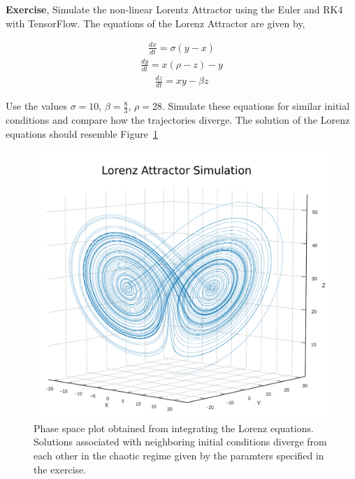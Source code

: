 \documentclass[10pt,letterpaper]{article}
\begin{document}
\textbf{Exercise}, Simulate the non-linear Lorentz Attractor using the Euler and RK4 with TensorFlow. The equations of the Lorenz Attractor are given by,

\begin{eqnarray}\frac{dx}{dt}=\sigma(y-x) \end{eqnarray}
\begin{eqnarray}\frac{dy}{dt}=x(\rho-z)-y \end{eqnarray}
\begin{eqnarray}\frac{dz}{dt}=xy-\beta z \end{eqnarray}

Use the values $\sigma =10$, $\beta =\frac{8}{3}$, $\rho =28$. Simulate these equations for similar initial conditions and compare how the trajectories diverge. The solution of the Lorenz equations should resemble Figure~\ref{fig:Lorenz}
 
\begin{figure}[H]
\begin{center}
\includegraphics[scale=0.5]{fig6_op.pdf} 
\caption{Phase space plot obtained from integrating the Lorenz equations. Solutions associated with neighboring initial conditions diverge from each other in the chaotic regime given by the paramters specified in the exercise.}
\label{fig:Lorenz}
\end{center}

\end{figure}
\end{document}
